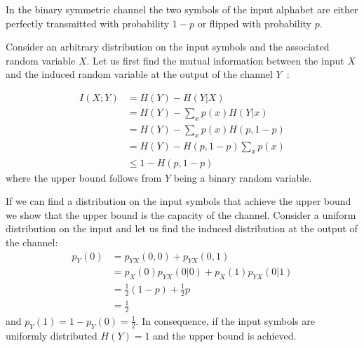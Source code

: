 \begin{solution}

In the binary symmetric channel the two symbols of the input alphabet are either perfectly transmitted with probability $1-p$ or flipped with probability $p$. 

Consider an arbitrary distribution on the input symbols and the associated random variable $X$. Let us first find the mutual information between the input $X$ and the induced random variable at the output of the channel $Y$~\cite{Cover_91}:

\begin{align}
I(X;Y) &= H(Y) - H(Y|X) \\
       &= H(Y) - \sum_x p(x)H(Y|x) \\
       &= H(Y) - \sum_x p(x)H(p,1-p) \\
       &= H(Y) - H(p,1-p)\sum_x p(x) \\
       &\leq 1 - H(p,1-p)\label{eq:bscC} 
\end{align}
where the upper bound follows from $Y$ being a binary random variable.

If we can find a distribution on the input symbols that achieve the upper bound we show that the upper bound is the capacity of the channel. Consider a uniform distribution on the input and let us find the induced distribution at the output of the channel:
\begin{align}
p_Y(0)&=p_{YX}(0,0)+p_{YX}(0,1)\\
      &=p_{X}(0)p_{YX}(0|0)+p_{X}(1)p_{YX}(0|1)\\
      &=\frac{1}{2}(1-p)+\frac{1}{2}p\\
      &=\frac{1}{2}
\end{align}
and $p_Y(1)=1-p_Y(0)=\frac{1}{2}$. In consequence, if the input symbols are uniformly distributed $H(Y)=1$ and the upper bound is achieved.
\end{solution}
